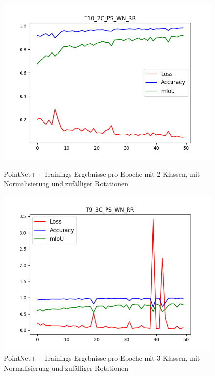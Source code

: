 \documentclass[12pt,titlepage, twoside]{article}
\begin{document}
\begin{figure}
    \centering
    \begin{minipage}{0.475\textwidth}
        \centering
        \includegraphics[width=1.0\textwidth]{./Images/10_2C_PS_WN_RR.png}
        \caption{PointNet++ Trainings-Ergebnisse pro Epoche mit 2 Klassen, mit Normalisierung und zufälliger Rotationen}
        \label{fig:10_2C_PS_WN_RR}
    \end{minipage}\hfill
    \begin{minipage}{0.475\textwidth}
        \centering
        \includegraphics[width=1.0\textwidth]{./Images/9_3C_PS_WN_RR.png}
        \caption{PointNet++ Trainings-Ergebnisse pro Epoche mit 3 Klassen, mit Normalisierung und zufälliger Rotationen}
        \label{fig:9_3C_PS_WN_RR}
    \end{minipage}
\end{figure}
\end{document}
